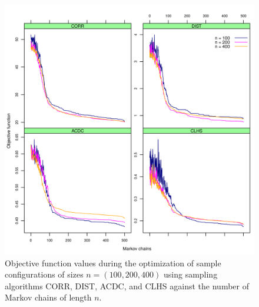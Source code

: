 \begin{figure}[!ht]
 \centering
 \includegraphics[width=\textwidth]{fig/chap08-energy-corr-dist-acdc-clhs}
 
 \caption[Objective function values during the optimization of three sample configurations using four sampling 
 algorithms.]{Objective function values during the optimization of sample configurations of sizes 
 $n = (100, 200, 400)$ using sampling algorithms CORR, DIST, ACDC, and CLHS against the number of Markov 
 chains of length $n$.}
 \label{fig:chap08-energy-all}
\end{figure}

